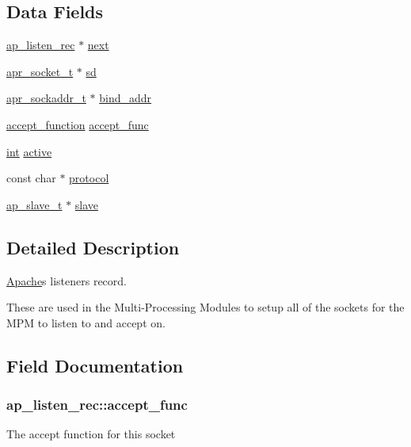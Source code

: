 \subsection*{Data Fields}
\begin{DoxyCompactItemize}
\item 
\hyperlink{structap__listen__rec}{ap\+\_\+listen\+\_\+rec} $\ast$ \hyperlink{structap__listen__rec_a4240c0e22e20ef521ba64dc91dbaba10}{next}
\item 
\hyperlink{structapr__socket__t}{apr\+\_\+socket\+\_\+t} $\ast$ \hyperlink{structap__listen__rec_af3eece1c155de1c17e4cdaa5c28873f9}{sd}
\item 
\hyperlink{structapr__sockaddr__t}{apr\+\_\+sockaddr\+\_\+t} $\ast$ \hyperlink{structap__listen__rec_aeb6a228184b3338fc4130859ccaac7ea}{bind\+\_\+addr}
\item 
\hyperlink{group__APACHE__CORE__LISTEN_gabf51c6b338f9923aec6586c1d5be7e59}{accept\+\_\+function} \hyperlink{structap__listen__rec_ae47114f5b84c62d305387c838a30abde}{accept\+\_\+func}
\item 
\hyperlink{pcre_8txt_a42dfa4ff673c82d8efe7144098fbc198}{int} \hyperlink{structap__listen__rec_a6c337d54da0ca7efccf3923a3e526bb1}{active}
\item 
const char $\ast$ \hyperlink{structap__listen__rec_a70ffffc8d550a4d8dc790951d7613876}{protocol}
\item 
\hyperlink{group__APACHE__CORE__LISTEN_ga04ffa2cefc7cae1fca59d225f4c7e78e}{ap\+\_\+slave\+\_\+t} $\ast$ \hyperlink{structap__listen__rec_a77d60349cd91f583fae41ff136c9ca53}{slave}
\end{DoxyCompactItemize}


\subsection{Detailed Description}
\hyperlink{namespaceApache}{Apache}\textquotesingle{}s listeners record. 

These are used in the Multi-\/\+Processing Modules to setup all of the sockets for the M\+PM to listen to and accept on. 

\subsection{Field Documentation}
\subsubsection[{\texorpdfstring{accept\+\_\+func}{accept_func}}]{ ap\+\_\+listen\+\_\+rec\+::accept\+\_\+func}\hypertarget{structap__listen__rec_ae47114f5b84c62d305387c838a30abde}{}\label{structap__listen__rec_ae47114f5b84c62d305387c838a30abde}
The accept function for this socket 
